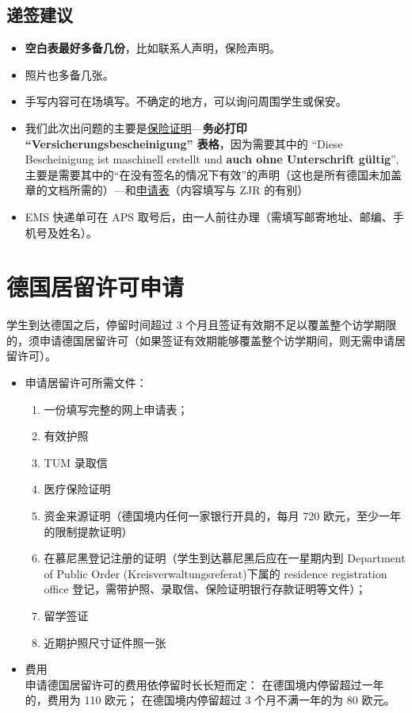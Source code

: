 \documentclass[final]{book}
\begin{document}
\section{递签建议}
\begin{itemize}
\item \textbf{\color{blue}空白表最好多备几份}，比如联系人声明，保险声明。
\item\label{print-fee} 照片也多备几张。
\item 手写内容可在场填写。不确定的地方，可以询问周围学生或保安。
\item\label{ensurance-Versicherungsbescheinigung} 我们此次出问题的主要是\underline{保险证明}---\textbf{\color{red}务必打印 ``Versicherungsbescheinigung'' 表格}，因为需要其中的 ``Diese Bescheinigung ist maschinell erstellt und \textbf{\color{red}auch ohne Unterschrift gültig}'', 主要是需要其中的“在没有签名的情况下有效”的声明（这也是所有德国未加盖章的文档所需的）---和\underline{申请表}（内容填写与 ZJR 的有别）%
\item EMS 快递单可在 APS 取号后，由一人前往办理（需填写邮寄地址、邮编、手机号及姓名）。
\end{itemize}
%

\chapter{德国居留许可申请}
学生到达德国之后，停留时间超过 3 个月且签证有效期不足以覆盖整个访学期限的，须申请德国居留许可（如果签证有效期能够覆盖整个访学期间，则无需申请居留许可）。
\begin{itemize}
\item 申请居留许可所需文件：
\begin{enumerate}
\item 一份填写完整的网上申请表；
\item 有效护照
\item TUM 录取信
\item 医疗保险证明
\item 资金来源证明（德国境内任何一家银行开具的，每月 720 欧元，至少一年的限制提款证明）
\item 在慕尼黑登记注册的证明（学生到达慕尼黑后应在一星期内到 Department of Public Order (Kreisverwaltungsreferat)下属的 residence registration office 登记，需带护照、录取信、保险证明银行存款证明等文件）；
\item 留学签证
\item 近期护照尺寸证件照一张
\end{enumerate}
\item 费用\\
申请德国居留许可的费用依停留时长长短而定：
在德国境内停留超过一年的，费用为 110 欧元；
在德国境内停留超过 3 个月不满一年的为 80 欧元。
\end{itemize}
\end{document}
